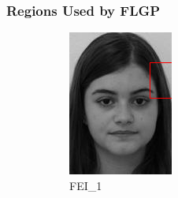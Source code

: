 \documentclass{article}
\begin{document}
\subsubsection*{Regions Used by FLGP}
\begin{figure}[h!]
	\centering
	\begin{subfigure}{0.49\linewidth}
		\includegraphics[width=\linewidth]{flgp_selection_f1.jpg}
		\caption{FEI\_1}
	\end{subfigure}
	\begin{subfigure}{0.49\linewidth}

\end{subfigure}
\end{figure}
\end{document}
